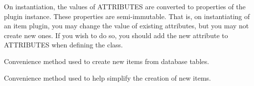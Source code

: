 \documentclass[letterpaper,10pt,english]{sphinxmanual}
\begin{document}
\begin{fulllineitems}
On instantiation, the values of ATTRIBUTES are converted to properties
of the plugin instance. These properties are semi-immutable. That is,
on instantiating of an item plugin, you may change the value of existing
attributes, but you may not create new ones. If you wish to do so, you
should add the new attribute to ATTRIBUTES when defining the class.

\begin{fulllineitems}
\label{api_reference:vice.plugins.items.Item.fromTable}
Convenience method used to create new items from database tables.

\end{fulllineitems}


\begin{fulllineitems}
\label{api_reference:vice.plugins.items.Item.new}
Convenience method used to help simplify the creation of new items.

\end{fulllineitems}


\end{fulllineitems}




\renewcommand{\indexname}{Index}
\printindex
\end{document}
